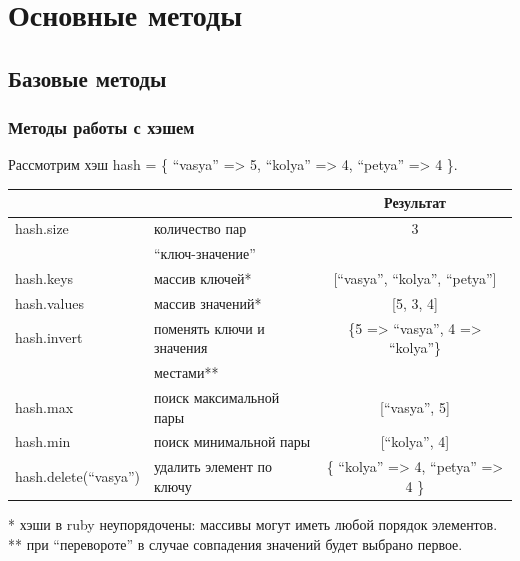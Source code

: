 \documentclass[compress,red]{beamer}
\begin{document}
\section{Основные методы}

\subsection{Базовые методы}
\begin{frame}[fragile]
  \frametitle{Методы работы с хэшем}
    \scriptsize{
  	  Рассмотрим хэш hash = \{ ``vasya'' => 5, ``kolya'' => 4, ``petya'' => 4 \}.
		}
		\newline
		
		\scriptsize{
		\begin{tabular}{|l|l|c|}
		\hline
		\centering{\textbf{Метод}} & \centering{\textbf{Описание}} & \textbf{Результат}\\
		\hline
		hash.size & количество пар & 3 \\
		          & ``ключ-значение'' & \\
		\hline
		hash.keys & массив ключей* & [``vasya'', ``kolya'', ``petya''] \\
		\hline
		hash.values & массив значений* & [5, 3, 4] \\
		\hline
		hash.invert & поменять ключи и значения & \{5 => ``vasya'', 4 => ``kolya''\} \\
		            & местами** & \\
		\hline
		hash.max & поиск максимальной пары & [``vasya'', 5] \\
		\hline
		hash.min & поиск минимальной пары & [``kolya'', 4] \\
		\hline
		hash.delete(``vasya'') & удалить элемент по ключу & \{ ``kolya'' => 4, ``petya'' => 4 \} \\
		\hline
		\end{tabular} }
		
		* хэши в ruby неупорядочены: массивы могут иметь любой порядок элементов.
		** при ``перевороте'' в случае совпадения значений будет выбрано первое.
\end{frame}
\end{document}
